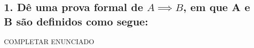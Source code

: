 \subsection*{1. Dê uma prova formal de $A \implies B$, em que A e B são definidos como segue:}

COMPLETAR ENUNCIADO